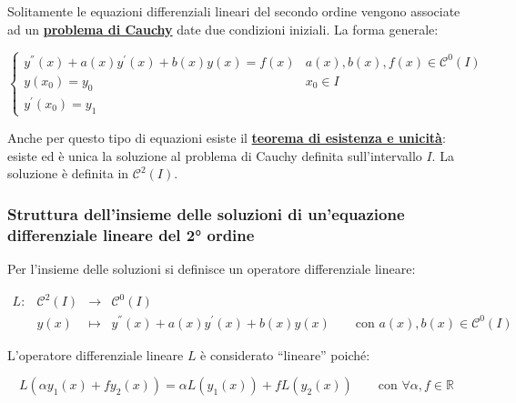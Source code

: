 \documentclass[a4paper]{article}
\newcommand{\dquotes}[1]{``#1''}
\begin{document}
	\noindent
	Solitamente le equazioni differenziali lineari del secondo ordine vengono associate ad un \textcolor{Red3}{\textbf{\underline{problema di Cauchy}}} date due condizioni iniziali. La forma generale:
	
	\begin{equation*}
		\begin{cases}
			y^{''}\left(x\right) + a\left(x\right)y^{'}\left(x\right) + b\left(x\right)y\left(x\right) = f\left(x\right) & a\left(x\right), b\left(x\right), f\left(x\right) \in \mathcal{C}^{0}\left(I\right) \\
			y\left(x_{0}\right) = y_{0} & x_{0} \in I \\
			y^{'}\left(x_{0}\right) = y_{1}
		\end{cases}
	\end{equation*}

	\noindent
	Anche per questo tipo di equazioni esiste il \textcolor{Red3}{\textbf{\underline{teorema di esistenza e unicità}}}: esiste ed è unica la soluzione al problema di Cauchy definita sull'intervallo $I$. La soluzione è definita in $\mathcal{C}^{2}\left(I\right)$.
	
	\vspace{2em}
	
	\subsubsection{Struttura dell'insieme delle soluzioni di un'equazione differenziale lineare del 2° ordine}
	
	Per l'insieme delle soluzioni si definisce un operatore differenziale lineare:
	
	\begin{equation*}
		\begin{array}{llll}
			L: 	& \mathcal{C}^{2}\left(I\right)	& \longrightarrow & \mathcal{C}^{0}\left(I\right) \\
				& y\left(x\right)				& \longmapsto	  & y^{''}\left(x\right) + a\left(x\right)y^{'}\left(x\right) + b\left(x\right)y\left(x\right) \hspace{2em} \text{con } a\left(x\right), b\left(x\right) \in \mathcal{C}^{0}\left(I\right)
		\end{array}
	\end{equation*}

	\noindent
	L'operatore differenziale lineare $L$ è considerato \dquotes{lineare} poiché:
	
	\begin{equation*}
		L\left(\alpha y_{1}\left(x\right) + f y_{2}\left(x\right)\right) = \alpha L\left(y_{1}\left(x\right)\right) + f L\left(y_{2}\left(x\right)\right) \hspace{2em} \text{con } \forall\alpha, f\in \mathbb{R}
	\end{equation*}
\end{document}
